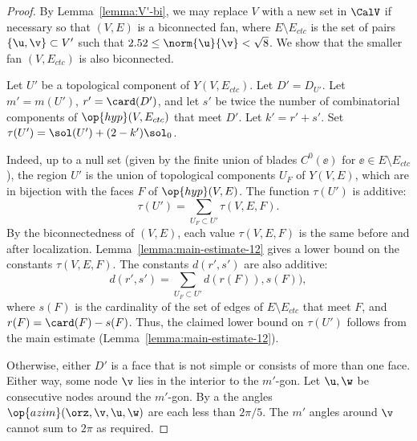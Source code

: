 \begin{proof}
  By Lemma~\ref{lemma:V'-bi}, we may replace $V$ with a new set in
  $\CalV$ if necessary so that $(V,E)$ is a biconnected fan, where
  $E\setminus E_{ctc}$ is the set of pairs $\{\u,\v\}\subset V'$ such
  that $2.52\le\norm{\u}{\v} <\sqrt8$.  We  show that the smaller
  fan $(V,E_{ctc})$ is also biconnected.

  Let $U'$ be a topological component of $Y(V,E_{ctc})$.  Let
  $D'=D_{U'}$.  Let $m'=m(U')$, $r' = \card(D')$, and let $s'$ be
  twice the number of combinatorial components of
  $\op{hyp}(V,E_{ctc})$ that meet $D'$.  Let $k'=r'+s'$.  Set
  $\tau(U') = \sol(U') + (2-k')\sol_0$.

  Indeed,
up to a null set (given by the finite union of blades $C^0(\ee)$ for
$\ee\in E\setminus E_{ctc}$), the region $U'$ is the union of topological
components $U_F$ of $Y(V,E)$, which are in bijection with the faces
$F$ of $\op{hyp}(V,E)$.  The function $\tau(U')$ is additive:
\[
\tau(U') = \sum_{U_F\subset U'} \tau(V,E,F).
\]
By the biconnectedness of $(V,E)$, each value $\tau(V,E,F)$ is the
same before and after localization.
Lemma~\ref{lemma:main-estimate-12} gives a lower bound on the
constants $\tau(V,E,F)$.  The constants $d(r',s')$ are also additive:
\[
d(r',s') = \sum_{U_F\subset U'} d(r(F)),s(F)),
\]
where $s(F)$ is the cardinality of the set of edges of $E\setminus
E_{ctc}$ that meet $F$, and $r(F) = \card(F)-s(F)$.  Thus, the claimed
lower bound on $\tau(U')$ follows from the main estimate
(Lemma~\ref{lemma:main-estimate-12}).


 Otherwise, either
$D'$ is a face that is not simple or consists of more than one face.
Either way, some node $\v$ lies in the interior to the $m'$-gon.  Let $\u,\w$ be
consecutive nodes around the $m'$-gon.  By a 
the angles $\op{azim}(\orz,\v,\u,\w)$ are each less than $2\pi/5$. The
$m'$ angles around $\v$ cannot sum to $2\pi$ as required.


\end{proof}
